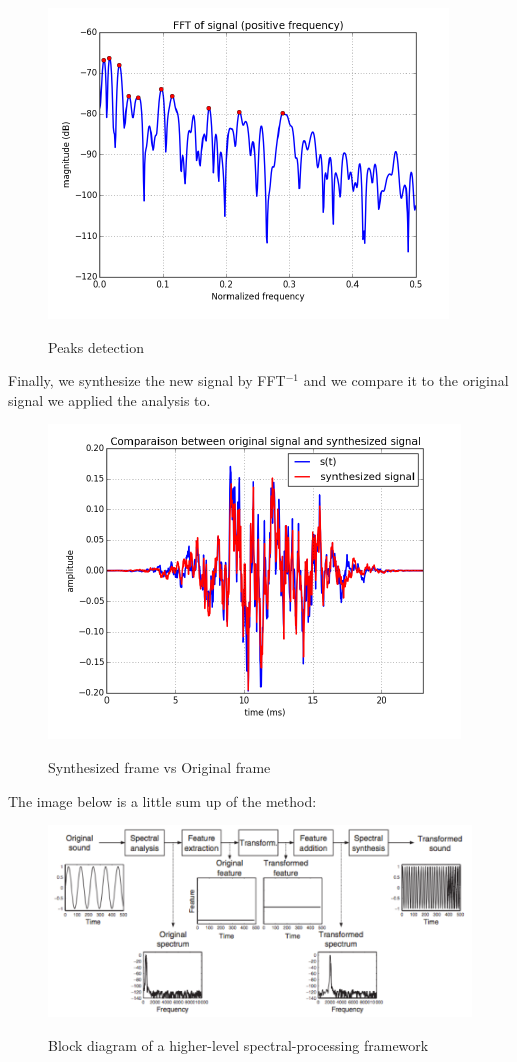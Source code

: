 \documentclass[]{article}
\begin{document}
\begin{figure} [H]
	\centering
	{\includegraphics[scale=0.7]{slide2.png}}
	\caption{Peaks detection}
\end{figure}
\medskip
Finally, we synthesize the new signal by FFT$^{-1}$ and we compare it to the original signal we applied the analysis to.

\begin{figure}[H]
	\centering
	{\includegraphics[scale=0.7]{synthesisstep.png}}
	\caption{Synthesized frame vs Original frame}
\end{figure}

The image below is a little sum up of the method:

\begin{figure}[H]
	\begin{center}
	{\includegraphics[scale = 0.8]{schema.png}}
	\caption{Block diagram of a higher-level spectral-processing framework}
	\end{center}
\end{figure}
\end{document}
